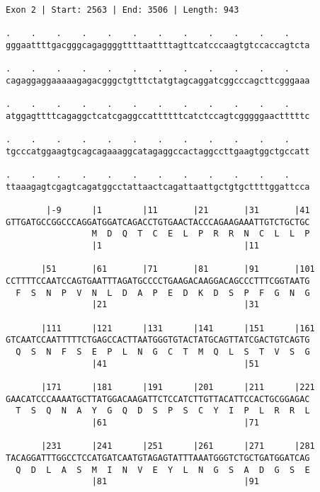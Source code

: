 \documentclass{article}
\begin{document}
\newpage
\begin{Verbatim}[fontfamily=courier]
Exon 2 | Start: 2563 | End: 3506 | Length: 943

.    .    .    .    .    .    .    .    .    .    .    .    
gggaattttgacgggcagaggggttttaattttagttcatcccaagtgtccaccagtcta

.    .    .    .    .    .    .    .    .    .    .    .    
cagaggaggaaaaagagacgggctgtttctatgtagcaggatcggcccagcttcgggaaa

.    .    .    .    .    .    .    .    .    .    .    .    
atggagttttcagaggctcatcgaggccattttttcatctccagtcgggggaactttttc

.    .    .    .    .    .    .    .    .    .    .    .    
tgcccatggaagtgcagcagaaaggcatagaggccactaggccttgaagtggctgccatt

.    .    .    .    .    .    .    .    .    .    .    .    
ttaaagagtcgagtcagatggcctattaactcagattaattgctgtgcttttggattcca

        |-9      |1        |11       |21       |31       |41
GTTGATGCCGGCCCAGGATGGATCAGACCTGTGAACTACCCAGAAGAAATTGTCTGCTGC
                 M  D  Q  T  C  E  L  P  R  R  N  C  L  L  P
                 |1                            |11          

       |51       |61       |71       |81       |91       |101
CCTTTTCCAATCCAGTGAATTTAGATGCCCCTGAAGACAAGGACAGCCCTTTCGGTAATG
  F  S  N  P  V  N  L  D  A  P  E  D  K  D  S  P  F  G  N  G
                 |21                           |31          

       |111      |121      |131      |141      |151      |161
GTCAATCCAATTTTTCTGAGCCACTTAATGGGTGTACTATGCAGTTATCGACTGTCAGTG
  Q  S  N  F  S  E  P  L  N  G  C  T  M  Q  L  S  T  V  S  G
                 |41                           |51          

       |171      |181      |191      |201      |211      |221
GAACATCCCAAAATGCTTATGGACAAGATTCTCCATCTTGTTACATTCCACTGCGGAGAC
  T  S  Q  N  A  Y  G  Q  D  S  P  S  C  Y  I  P  L  R  R  L
                 |61                           |71          

       |231      |241      |251      |261      |271      |281
TACAGGATTTGGCCTCCATGATCAATGTAGAGTATTTAAATGGGTCTGCTGATGGATCAG
  Q  D  L  A  S  M  I  N  V  E  Y  L  N  G  S  A  D  G  S  E
                 |81                           |91          

\end{Verbatim}
\newpage
\end{document}
